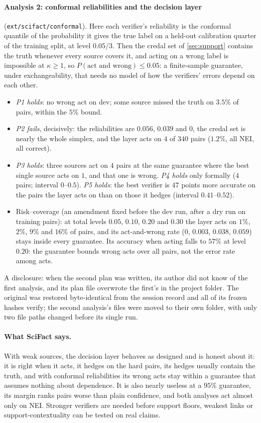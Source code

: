 \documentclass[11pt]{article}
\theoremstyle{definition}
\theoremstyle{remark}
\begin{document}
\paragraph{Analysis 2: conformal reliabilities and the decision layer} (\texttt{ext/scifact/conformal}). Here each verifier's
reliability is the conformal quantile of the probability it gives the true label on a held-out calibration quarter of the training
split, at level $0.05/3$. Then the credal set of \cref{sec:support} contains the truth whenever every source covers it, and acting on a
wrong label is impossible at $\kappa\ge1$, so $P(\text{act and wrong})\le0.05$: a finite-sample guarantee, under exchangeability,
that needs no model of how the verifiers' errors depend on each other.
\begin{itemize}[leftmargin=*,nosep]
\item \emph{P1 holds}: no wrong act on dev; some source missed the truth on $3.5\%$ of pairs, within the $5\%$ bound.
\item \emph{P2 fails}, decisively: the reliabilities are $0.056$, $0.039$ and $0$, the credal set is nearly the whole simplex, and the
  layer acts on $4$ of $340$ pairs ($1.2\%$, all NEI, all correct).
\item \emph{P3 holds}: three sources act on $4$ pairs at the same guarantee where the best single source acts on $1$, and that one is
  wrong. \emph{P4 holds} only formally ($4$ pairs; interval $0$--$0.5$). \emph{P5 holds}: the best verifier is $47$ points more
  accurate on the pairs the layer acts on than on those it hedges (interval $0.41$--$0.52$).
\item Risk--coverage (an amendment fixed before the dev run, after a dry run on training pairs): at total levels $0.05$, $0.10$,
  $0.20$ and $0.30$ the layer acts on $1\%$, $2\%$, $9\%$ and $16\%$ of pairs, and its act-and-wrong rate ($0$, $0.003$, $0.038$,
  $0.059$) stays inside every guarantee. Its accuracy when acting falls to $57\%$ at level $0.20$: the guarantee bounds wrong acts
  over all pairs, not the error rate among acts.
\end{itemize}
A disclosure: when the second plan was written, its author did not know of the first analysis, and its plan file overwrote the
first's in the project folder. The original was restored byte-identical from the session record and all of its frozen hashes verify;
the second analysis's files were moved to their own folder, with only two file paths changed before its single run.

\paragraph{What SciFact says.} With weak sources, the decision layer behaves as designed and is honest about it: it is right when it
acts, it hedges on the hard pairs, its hedges usually contain the truth, and with conformal reliabilities its wrong acts stay within a
guarantee that assumes nothing about dependence. It is also nearly useless at a $95\%$ guarantee, its margin ranks pairs worse than
plain confidence, and both analyses act almost only on NEI. Stronger verifiers are needed before support floors, weakest links or
support-contextuality can be tested on real claims.
\end{document}
